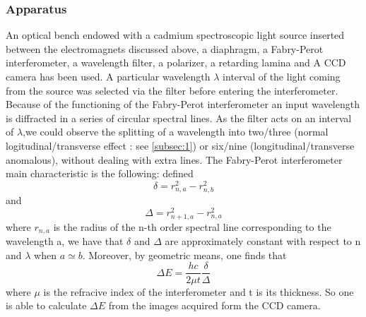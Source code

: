\documentclass[a4paper,12pt,abstracton]{scrartcl}
\begin{document}
\subsubsection{Apparatus}
An optical bench endowed with a cadmium spectroscopic light source inserted between the electromagnets discussed above, a diaphragm, a Fabry-Perot interferometer, a wavelength filter, a polarizer, a retarding lamina and A CCD camera has been used. A particular wavelength $\lambda$ interval of the light coming from the source was selected via the filter before entering the interferometer. Because of the functioning of the Fabry-Perot interferometer an input wavelength is diffracted in a series of circular spectral lines. As the filter acts on an interval of $\lambda$,we could observe the splitting of a wavelength into two/three (normal logitudinal/transverse effect : see \ref{subsec:1}) or six/nine (longitudinal/transverse anomalous), without dealing with extra lines. The Fabry-Perot interferometer main characteristic is the following:\newline
defined $$\delta = r^2_{n,a}-r^2_{n,b}$$ and $$\Delta = r^2_{n+1,a}-r^2_{n,a}$$  where $r_{n,a}$ is the radius of the n-th order spectral line corresponding to the wavelength a, we have that $\delta$ and $\Delta$ are approximately constant with respect to n and $\lambda$ when $a\simeq b$. Moreover, by geometric means, one finds that 
\begin{equation} \label{eq:1}
\Delta E  = \frac{hc}{2\mu t} \frac{\delta}{\Delta}
\end{equation}
 where $\mu$ is the refracive index of the interferometer and t is its thickness. So one is able to calculate $\Delta E$ from the images acquired form the CCD camera.
\end{document}
